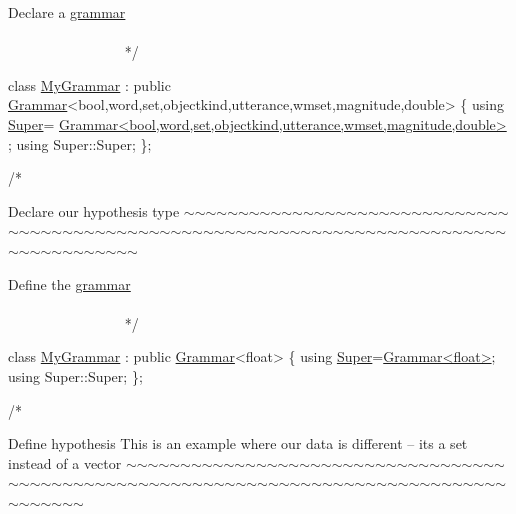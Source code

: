 \begin{DoxyCode}
    Declare a \hyperlink{class_l_o_t_hypothesis_affae32db28c39df676809ae47e14e7cf}{grammar}
   ~~~~~~~~~~~~~~~~~~~~~~~~~~~~~~~~~~~~~~~~~~~~~~~~~~~~~~~~~~~~~~~~~~~~~~~~~~~~~~~~~~~~~~~~ */



\textcolor{keyword}{class }\hyperlink{class_my_grammar}{MyGrammar} : \textcolor{keyword}{public} \hyperlink{class_grammar}{Grammar}<bool,word,set,objectkind,utterance,wmset,magnitude,double>
       \{
    \textcolor{keyword}{using} \hyperlink{class_my_hypothesis_a266742f266abc638ddc1d1870d735313}{Super}=
      \hyperlink{class_grammar}{Grammar<bool,word,set,objectkind,utterance,wmset,magnitude,double>}
      ;
    \textcolor{keyword}{using} Super::Super;
\};

\textcolor{comment}{/*}
\end{DoxyCode}
 Declare our hypothesis type $\sim$$\sim$$\sim$$\sim$$\sim$$\sim$$\sim$$\sim$$\sim$$\sim$$\sim$$\sim$$\sim$$\sim$$\sim$$\sim$$\sim$$\sim$$\sim$$\sim$$\sim$$\sim$$\sim$$\sim$$\sim$$\sim$$\sim$$\sim$$\sim$$\sim$$\sim$$\sim$$\sim$$\sim$$\sim$$\sim$$\sim$$\sim$$\sim$$\sim$$\sim$$\sim$$\sim$$\sim$$\sim$$\sim$$\sim$$\sim$$\sim$$\sim$$\sim$$\sim$$\sim$$\sim$$\sim$$\sim$$\sim$$\sim$$\sim$$\sim$$\sim$$\sim$$\sim$$\sim$$\sim$$\sim$$\sim$$\sim$$\sim$$\sim$$\sim$$\sim$$\sim$$\sim$$\sim$$\sim$$\sim$$\sim$$\sim$$\sim$$\sim$$\sim$$\sim$$\sim$$\sim$$\sim$$\sim$$\sim$


\begin{DoxyCode}
    Define the \hyperlink{class_l_o_t_hypothesis_affae32db28c39df676809ae47e14e7cf}{grammar}
   ~~~~~~~~~~~~~~~~~~~~~~~~~~~~~~~~~~~~~~~~~~~~~~~~~~~~~~~~~~~~~~~~~~~~~~~~~~~~~~~~~~~~~~~~ */



\textcolor{keyword}{class }\hyperlink{class_my_grammar}{MyGrammar} : \textcolor{keyword}{public} \hyperlink{class_grammar}{Grammar}<float> \{
    \textcolor{keyword}{using} \hyperlink{class_my_hypothesis_a266742f266abc638ddc1d1870d735313}{Super}=\hyperlink{class_grammar}{Grammar<float>};
    \textcolor{keyword}{using} Super::Super;
\};


\textcolor{comment}{/*}
\end{DoxyCode}
 Define hypothesis This is an example where our data is different -- it\textquotesingle{}s a set instead of a vector $\sim$$\sim$$\sim$$\sim$$\sim$$\sim$$\sim$$\sim$$\sim$$\sim$$\sim$$\sim$$\sim$$\sim$$\sim$$\sim$$\sim$$\sim$$\sim$$\sim$$\sim$$\sim$$\sim$$\sim$$\sim$$\sim$$\sim$$\sim$$\sim$$\sim$$\sim$$\sim$$\sim$$\sim$$\sim$$\sim$$\sim$$\sim$$\sim$$\sim$$\sim$$\sim$$\sim$$\sim$$\sim$$\sim$$\sim$$\sim$$\sim$$\sim$$\sim$$\sim$$\sim$$\sim$$\sim$$\sim$$\sim$$\sim$$\sim$$\sim$$\sim$$\sim$$\sim$$\sim$$\sim$$\sim$$\sim$$\sim$$\sim$$\sim$$\sim$$\sim$$\sim$$\sim$$\sim$$\sim$$\sim$$\sim$$\sim$$\sim$$\sim$$\sim$$\sim$$\sim$$\sim$$\sim$$\sim$$\sim$


